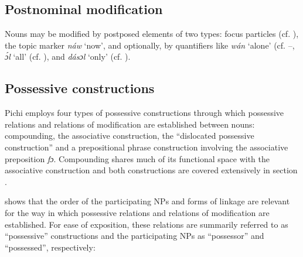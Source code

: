 \subsection{Postnominal modification}

Nouns may be modified by postposed elements of two types: focus particles (cf. ), the topic marker \textit{náw} ‘now’, and optionally, by quantifiers like \textit{wán} ‘alone’ (cf. –, \textit{ɔ́l} ‘all’ (cf. ), and \textit{dásɔl} ‘only’ (cf. ). 

\subsection{Possessive constructions}\label{sec:5.2.3}

Pichi employs four types of possessive constructions through which possessive relations and relations of modification are established between nouns: compounding, the associative construction, the “dislocated possessive construction” \citep[160]{Kouwenberg1994} and a prepositional phrase construction involving the associative preposition \textit{fɔ}. Compounding shares much of its functional space with the associative construction and both constructions are covered extensively in section .

 shows that the order of the participating NPs and forms of linkage are relevant for the way in which possessive relations and relations of modification are established. For ease of exposition, these relations are summarily referred to as “possessive” constructions and the participating NPs as “possessor” and “possessed”, respectively:

